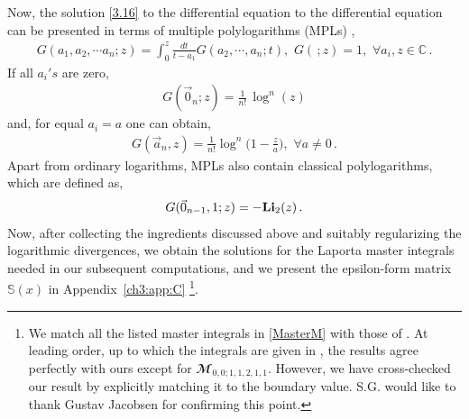 \noindent
Now, the solution \eqref{3.16} to the differential equation to the differential equation can be presented in terms of multiple
polylogarithms (MPLs) \cite{Remiddi:1999ew,goncha},
\begin{align}
    G(a_1,a_2,\cdots a_n;z)=\int_{0}^z \frac{dt}{t-a_1}G(a_2,\cdots,a_n;t),\,\, G(\,;z)=1,\,\,\forall a_i,z\in \mathbb{C}\,.
\end{align}
If all $a_i's$ are zero, 
\begin{align}
    G(\vec 0_n;z)=\frac{1}{n!}\,\log^{n}(z)
\end{align}
and, for equal $a_i=a$ one can obtain,
\begin{align}
    G(\vec a_n,z)=\frac{1}{n! }\log^{n}\Big(1-\frac{z}{a}\Big),\,\,\forall a\ne 0\,.
\end{align}
Apart from ordinary logarithms, MPLs also contain classical polylogarithms, which are defined as,
\begin{align}
    \begin{split}
        G(\vec 0_{n-1},1;z)=- \textrm{{\bf Li}}_2(z)\,.
    \end{split}
\end{align}
Now, after collecting the ingredients discussed above and suitably regularizing the logarithmic divergences, we obtain the solutions for the Laporta master integrals needed in our subsequent computations, and we present the epsilon-form matrix $\mathbb{S}(x)$ in Appendix~\eqref{ch3:app:C} \footnote{{We match all the listed master integrals in \eqref{MasterM} with those of \cite{Jakobsen:2022fcj}. At leading order, up to which the integrals are given in \cite{Jakobsen:2022fcj}, the results agree perfectly with ours except for $\mathbfcal{M}_{0,0;1,1,2,1,1}$. However, we have cross-checked our result by explicitly matching it to the boundary value. S.G. would like to thank Gustav Jacobsen for confirming this point. }}.
